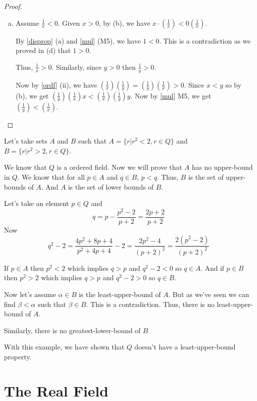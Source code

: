 \begin{proof}
\begin{enumerate}[a)]
		\item Assume $\frac{1}{x} < 0$. Given $x > 0$, by (b),
		 we have $x \cdot \left( \frac{1}{x} \right) < 0 \left( \frac{1}{x} \right)$.

		By \ref{disprop} (a) and \ref{mul} (M5), we have $1 < 0$.
		This is a contradiction as we proved in (d) that $1 > 0$.

		Thus, $\frac{1}{x} > 0$. Similarly, since $y > 0$ then $\frac{1}{y} > 0$.

		Now by \ref{ordf} (ii), we have $( \frac{1}{x} ) ( \frac{1}{y} )
			= ( \frac{1}{y} )( \frac{1}{x} ) > 0$.
		Since $x < y$ so by (b), we get $(\frac{1}{y}) (\frac{1}{x}) x < (\frac{1}{x}) (\frac{1}{y}) y $.
		Now by \ref{mul} M5, we get $( \frac{1}{y} ) < ( \frac{1}{x} )$.
	\end{enumerate}
\end{proof}

\begin{exmp}
	Let's take sets $A$ and $B$ such that $A = \{ r | r^2 < 2, r \in Q \}$
	and $B = \{ r | r^2 > 2, r \in Q \}$.

	We know that $Q$ is a ordered field. Now we will prove that $A$ has no upper-bound in $Q$.
	We know that for all $p \in A$ and $q \in B$, $p < q$. Thus, $B$ is the set of upper-bounds of $A$.
	And $A$ is the set of lower bounds of $B$.

	Let's take an element $p \in Q$ and $$ q = p - \frac{p^2 - 2}{p + 2} = \frac{2p + 2}{p + 2} $$
	Now $$ q^2 - 2 = \frac{4p^2 + 8p + 4}{p^2 + 4p + 4} - 2 = \frac{2p^2 - 4}{(p+2)^2} = \frac{2(p^2 - 2)}{(p+2)^2} $$

	If $p \in A$ then $p^2 < 2$ which implies $q > p$ and $q^2 - 2 < 0$ so $q \in A$.
	And if $p \in B$ then $p^2 > 2$ which implies $q > p$ and $q^2 - 2 > 0$ so $q \in B$.

	Now let's assume $\alpha \in B$ is the least-upper-bound of $A$.
	But as we've seen we can find $\beta < \alpha$ such that $\beta \in B$.
	This is a contradiction. Thus, there is no least-upper-bound of $A$.

	Similarly, there is no greatest-lower-bound of $B$

\end{exmp}

With this example, we have shown that $Q$ doesn't have a least-upper-bound property.

\section{The Real Field}

